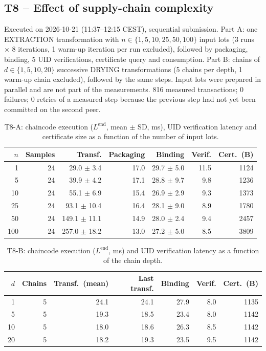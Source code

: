 \subsection{T8 -- Effect of supply-chain complexity}
Executed on 2026-10-21 (11:37--12:15 CEST), sequential submission.
Part A: one EXTRACTION transformation with $n \in \{1, 5, 10, 25, 50, 100\}$ input lots (3 runs $\times$ 8
iterations, 1 warm-up iteration per run excluded), followed by packaging, binding, 5 UID verifications,
certificate query and consumption. Part B: chains of $d \in \{1, 5, 10, 20\}$ successive DRYING transformations
(5 chains per depth, 1 warm-up chain excluded), followed by the same steps. Input lots were prepared in parallel
and are not part of the measurements. 816 measured transactions; 0 failures;
0 retries of a measured step because the previous step had not yet been committed on the second peer.

\begin{table}[H]
\centering\small
\caption{T8-A: chaincode execution ($L^{\mathrm{end}}$, mean $\pm$ SD, ms), UID verification latency and certificate size as
a function of the number of input lots.}
\label{tab:t8a}
\setlength{\tabcolsep}{3.5pt}
\begin{tabular}{rrrrrrr}
\toprule
$n$ & Samples & Transf. & Packaging & Binding & Verif. & Cert.\ (B) \\
\midrule
1 & 24 & 29.0 $\pm$ 3.4 & 17.0 & 29.7 $\pm$ 5.0 & 11.5 & 1124 \\
5 & 24 & 39.9 $\pm$ 4.2 & 17.1 & 28.8 $\pm$ 9.7 & 9.8 & 1236 \\
10 & 24 & 55.1 $\pm$ 6.9 & 15.4 & 26.9 $\pm$ 2.9 & 9.3 & 1373 \\
25 & 24 & 93.1 $\pm$ 10.4 & 16.4 & 28.1 $\pm$ 9.0 & 8.9 & 1780 \\
50 & 24 & 149.1 $\pm$ 11.1 & 14.9 & 28.0 $\pm$ 2.4 & 9.4 & 2457 \\
100 & 24 & 257.0 $\pm$ 18.2 & 13.0 & 27.2 $\pm$ 5.0 & 8.5 & 3809 \\
\bottomrule
\end{tabular}
\end{table}

\begin{table}[H]
\centering\small
\caption{T8-B: chaincode execution ($L^{\mathrm{end}}$, ms) and UID verification latency as a function of the chain depth.}
\label{tab:t8b}
\setlength{\tabcolsep}{3.5pt}
\begin{tabular}{rrrrrrr}
\toprule
$d$ & Chains & Transf.\ (mean) & Last transf. & Binding & Verif. & Cert.\ (B) \\
\midrule
1 & 5 & 24.1 & 24.1 & 27.9 & 8.0 & 1135 \\
5 & 5 & 19.3 & 18.5 & 23.4 & 8.0 & 1142 \\
10 & 5 & 18.0 & 18.6 & 26.3 & 8.5 & 1142 \\
20 & 5 & 18.2 & 19.3 & 23.5 & 9.5 & 1142 \\
\bottomrule
\end{tabular}
\end{table}

